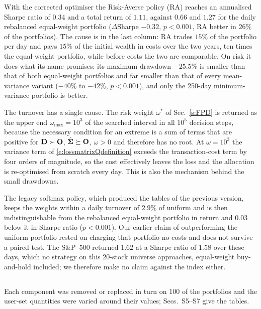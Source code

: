 With the corrected optimiser the Risk-Averse policy (RA) reaches an annualised Sharpe ratio of $0.34$ and a total return of $1.11$, against $0.66$ and $1.27$ for the daily rebalanced equal-weight portfolio ($\Delta$Sharpe $-0.32$, $p<0.001$, RA better in $26\%$ of the portfolios). The cause is in the last column: RA trades $15\%$ of the portfolio per day and pays $15\%$ of the initial wealth in costs over the two years, ten times the equal-weight portfolio, while before costs the two are comparable. On risk it does what its name promises: its maximum drawdown $-25.5\%$ is smaller than that of both equal-weight portfolios and far smaller than that of every mean-variance variant ($-40\%$ to $-42\%$, $p<0.001$), and only the 250-day minimum-variance portfolio is better.

The turnover has a single cause. The risk weight $\omega^{\ast}$ of Sec.~\ref{s:FPD} is returned as the upper end $\omega_{\max}=10^3$ of the searched interval in all $10^5$ decision steps, because the necessary condition for an extreme is a sum of terms that are positive for $\mathbf{D}\succ\mathbf{O}$, $\hat{\mathbf{\Sigma}}\succeq\mathbf{O}$, $\omega>0$ and therefore has no root. At $\omega=10^3$ the variance term of \eqref{e:lossmatrixQdefinition} exceeds the transaction-cost term by four orders of magnitude, so the cost effectively leaves the loss and the allocation is re-optimised from scratch every day. This is also the mechanism behind the small drawdowns.

The legacy softmax policy, which produced the tables of the previous version, keeps the weights within a daily turnover of $2.9\%$ of uniform and is then indistinguishable from the rebalanced equal-weight portfolio in return and $0.03$ below it in Sharpe ratio ($p<0.001$). Our earlier claim of outperforming the uniform portfolio rested on charging that portfolio no costs and does not survive a paired test. The S\&P~500 returned $1.62$ at a Sharpe ratio of $1.58$ over these days, which no strategy on this 20-stock universe approaches, equal-weight buy-and-hold included; we therefore make no claim against the index either.




\subsection{} \label{s:ablation_results}\label{s:sensitivity}\label{s:stress}
Each component was removed or replaced in turn on 100 of the portfolios and the user-set quantities were varied around their values; Secs.~S5--S7 give the tables.

